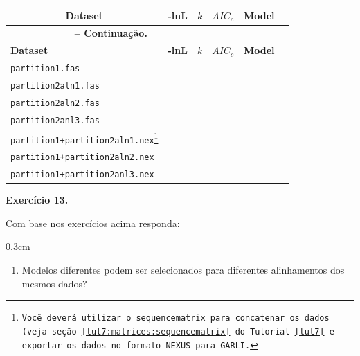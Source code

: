 \begin{refsection}
\begin{center}
\begin{longtable}{|l|>{\centering}m{2cm}|c|>{\centering}m{2cm}|>{\centering}m{2cm} |@{}m{0pt}@{}}
\hline\hline  \multicolumn{1}{|c|}{\textbf{Dataset}} & \textbf{-lnL}  & \textbf{$k$} & \textbf{$AIC_{c}$} & \textbf{Model} &\\
\endfirsthead

\multicolumn{3}{c}{{\bfseries \tablename\ \thetable{} -- Continuação.}}\\
\hline\hline \textbf{Dataset} & \textbf{-lnL}  & \textbf{$k$} & \textbf{$AIC_{c}$} & \textbf{Model} &\\
\endhead
\hline \hline
\endlastfoot
\hline\hline \texttt{partition1.fas} &  & & & &\\
\hline \texttt{partition2aln1.fas} &  & & & &\\
\hline \texttt{partition2aln2.fas} &  & & & &\\
\hline \texttt{partition2anl3.fas} &  & & & &\\
\hline \texttt{partition1+partition2aln1.nex\footnote{ Você deverá utilizar o \texttt{sequencematrix} para concatenar os dados (veja seção \ref{tut7:matrices:sequencematrix} do Tutorial \ref{tut7} e exportar os dados no formato \texttt{NEXUS} para \texttt{GARLI}.}} &  & & & &\\
\hline \texttt{partition1+partition2aln2.nex} &  & & & &\\
\hline \texttt{partition1+partition2anl3.nex} &  & & & &\\
\end{longtable}
\end{center}


\begin{blackBlock}{\textbf{Exercício 13.}}\label{tut12:ex:13.7}

Com base nos exercícios acima responda:

\end{blackBlock}


\begin {myindentpar}{0.3cm}
\begin{enumerate}[\itshape i.]
	\item{Modelos diferentes podem ser selecionados para diferentes alinhamentos dos mesmos dados?}


\end{enumerate}
\end{myindentpar}
\end{refsection}
